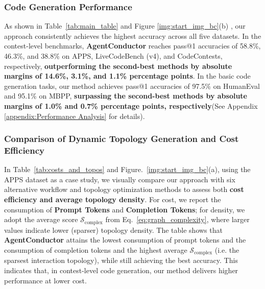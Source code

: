 \documentclass{article}
\theoremstyle{definition}
\begin{document}
\subsubsection{Code Generation Performance}
\label{graph:main_results}



As shown in Table~\ref{tab:main_table} and Figure \ref{img:start_img_bc}(b) , our approach consistently achieves the highest accuracy across all five datasets. In the contest-level benchmarks, \textbf{AgentConductor} reaches pass@1 accuracies of 58.8\%, 46.3\%, and 38.8\% on APPS, LiveCodeBench (v4), and CodeContests, respectively, \textbf{outperforming the second-best methods by absolute margins of 14.6\%, 3.1\%, and 1.1\% percentage points}. In the basic code generation tasks, our method achieves pass@1 accuracies of 97.5\% on HumanEval and 95.1\%  on MBPP, \textbf{surpassing the second-best methods by absolute margins of 1.0\% and 0.7\% percentage points, respectively}(See Appendix \ref{appendix:Performance Analysis} for details).





\subsubsection{Comparison of Dynamic Topology Generation and Cost Efficiency}
\label{graph:cost_results}







In Table~\ref{tab:costs_and_topos} and Figure.~\ref{img:start_img_bc}(a), using the APPS dataset as a case study, we visually compare our approach with six alternative workflow and topology optimization methods to assess both \textbf{cost efficiency and average topology density}. For cost, we report the consumption of \textbf{Prompt Tokens} and \textbf{Completion Tokens}; for density, we adopt the average score \textbf{$\mathcal{S}_{\text{complex}}$} from Eq.~\ref{eq:graph_complexity}, where larger values indicate lower (sparser) topology density. The table shows that \textbf{AgentConductor} attains the lowest consumption of prompt tokens and the consumption of completion tokens and the highest average $\mathcal{S}_{\text{complex}}$ (i.e. the sparsest interaction topology), while still achieving the best accuracy. This indicates that, in contest-level code generation, our method delivers higher performance at lower cost.
\end{document}
